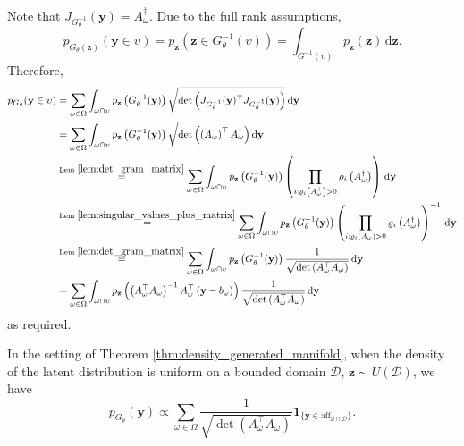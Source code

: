 \begin{tproof}
    Note that $J_{G_{\theta}^{-1}}(\mathbf{y})=A^{\dagger}_{\omega}$. Due to the full rank assumptions, $$p_{G_{\theta}(\mathbf{z})}(\mathbf{y}\in\upsilon)=p_{\mathbf{z}}\left(\mathbf{z}\in G_{\theta}^{-1}(\upsilon)\right)=\int_{G^{-1}(\upsilon)}p_{\mathbf{z}}(\mathbf{z})\,\mathrm{d}\mathbf{z}.$$Therefore,
    \begin{align*}
        p_{G_{\theta}}(\mathbf{y}\in\upsilon)&=\sum_{\omega\in\Omega}\int_{\omega\cap\upsilon}p_{\mathbf{z}}\left(G_{\theta}^{-1}(\mathbf{y})\right)\sqrt{\det\left(J_{G_{\theta}^{-1}}(\mathbf{y})^\top J_{G_{\theta}^{-1}}(\mathbf{y})\right)}\,\mathrm{d}\mathbf{y}\\&=\sum_{\omega\in\Omega}\int_{\omega\cap\upsilon}p_{\mathbf{z}}\left(G_{\theta}^{-1}(\mathbf{y})\right)\sqrt{\det\left(\left(A_{\omega}\right)^\top A_{\omega}^{\dagger}\right)}\,\mathrm{d}\mathbf{y}\\&\overset{\text{Lem }\ref{lem:det_gram_matrix}}{=}\sum_{\omega\in\Omega}\int_{\omega\cap\upsilon}p_{\mathbf{z}}\left(G_{\theta}^{-1}(\mathbf{y})\right)\left(\prod_{i:\varrho_i\left(A_{\omega}^+\right)>0}\varrho_i\left(A_{\omega}^{\dagger}\right)\right)\,\mathrm{d}\mathbf{y}\\&\overset{\text{Lem }\ref{lem:singular_values_plus_matrix}}{=}\sum_{\omega\in\Omega}\int_{\omega\cap\upsilon}p_{\mathbf{z}}\left(G_{\theta}^{-1}(\mathbf{y})\right)\left(\prod_{i:\varrho_i\left(A_{\omega}\right)>0}\varrho_i\left(A_{\omega}^{\dagger}\right)\right)^{-1}\,\mathrm{d}\mathbf{y}\\&\overset{\text{Lem }\ref{lem:det_gram_matrix}}{=}\sum_{\omega\in\Omega}\int_{\omega\cap\upsilon}p_{\mathbf{z}}\left(G_{\theta}^{-1}(\mathbf{y})\right)\frac{1}{\sqrt{\det\left(A_{\omega}^\top A_{\omega}\right)}}\,\mathrm{d}\mathbf{y}\\&=\sum_{\omega\in\Omega}\int_{\omega\cap\upsilon}p_{\mathbf{z}}\left(\left(A_{\omega}^\top A_{\omega}\right)^{-1}A_{\omega}^\top\left(\mathbf{y}-b_{\omega}\right)\right)\frac{1}{\sqrt{\det\left(A_{\omega}^\top A_{\omega}\right)}}\,\mathrm{d}\mathbf{y}
    \end{align*}
    as required.
\end{tproof}

\begin{corollary}\label{cor:uniform_latents_generated_distribution}
    In the setting of Theorem \ref{thm:density_generated_manifold}, when the density of the latent distribution is uniform on a bounded domain $\mathcal{D}$, $\mathbf{z}\sim U(\mathcal{D})$, we have $$p_{G_{\theta}}(\mathbf{y})\propto\sum_{\omega\in\Omega}\frac{1}{\sqrt{\det\left(A_{\omega}^\top A_{\omega}\right)}}\mathbf{1}_{\{\mathbf{y}\in\mathrm{aff}_{\omega\cap\mathcal{D}}\}}.$$
\end{corollary}

